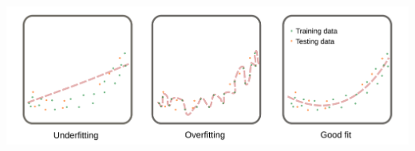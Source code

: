 \documentclass[aspectratio=169]{beamer}
\begin{document}
\begin{frame}
  \begin{center}
    \includegraphics[width=14cm]{images/fitting_underfitting_overfitting.pdf}
  \end{center}    
\end{frame}
        

\end{document}
